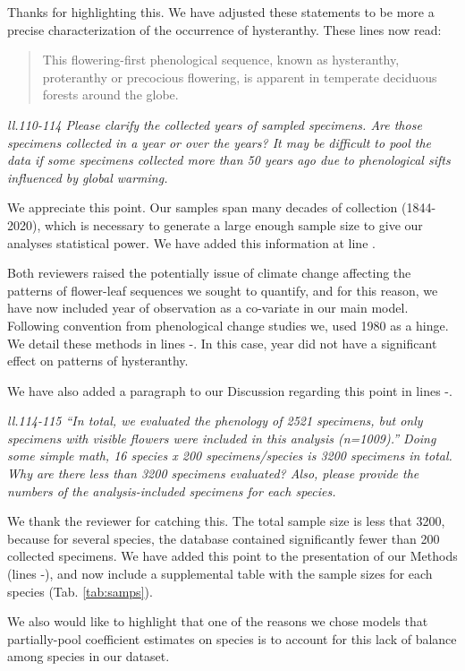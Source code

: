 \documentclass{article}[12pt]
\begin{document}
Thanks for highlighting this. We have adjusted these statements to be more a precise characterization of the occurrence of hysteranthy. These lines now read:
\begin{quote} This flowering-first phenological sequence, known as hysteranthy, proteranthy or precocious flowering, is apparent in temperate deciduous forests around the globe. \end{quote}

\emph{ll.110-114 Please clarify the collected years of sampled specimens. Are those specimens collected in a year or over the years? It may be difficult to pool the data if some specimens collected more than 50 years ago due to phenological sifts influenced by global warming.}

We appreciate this point. Our samples span many decades of collection (1844-2020), which is necessary to generate a large enough sample size to give our analyses statistical power. We have added this information at line .

Both reviewers raised the potentially issue of climate change affecting the patterns of flower-leaf sequences we sought to quantify, and for this reason, we have now included year of observation as a co-variate in our main model. Following convention from phenological change studies we, used 1980 as a hinge. We detail these methods in lines -. In this case, year did not have a significant effect on patterns of hysteranthy.

We have also added a paragraph to our Discussion regarding this point in lines -.

\emph{ll.114-115 “In total, we evaluated the phenology of 2521 specimens, but only specimens with visible flowers were included in this analysis (n=1009).”
Doing some simple math, 16 species x 200 specimens/species is 3200 specimens in total. Why are there less than 3200 specimens evaluated? Also, please provide the numbers of the analysis-included specimens for each species.}

We thank the reviewer for catching this. The total sample size is less that 3200, because for several species, the database contained significantly fewer than 200 collected specimens. We have added this point to the presentation of our Methods (lines -), and now include a supplemental table with the sample sizes for each species (Tab. \ref{tab:samps}). 

We also would like to highlight that one of the reasons we chose models that partially-pool coefficient estimates on species is to account for this lack of balance among species in our dataset.
\end{document}
